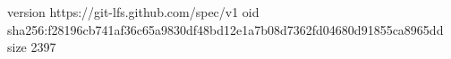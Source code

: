 version https://git-lfs.github.com/spec/v1
oid sha256:f28196cb741af36c65a9830df48bd12e1a7b08d7362fd04680d91855ca8965dd
size 2397
